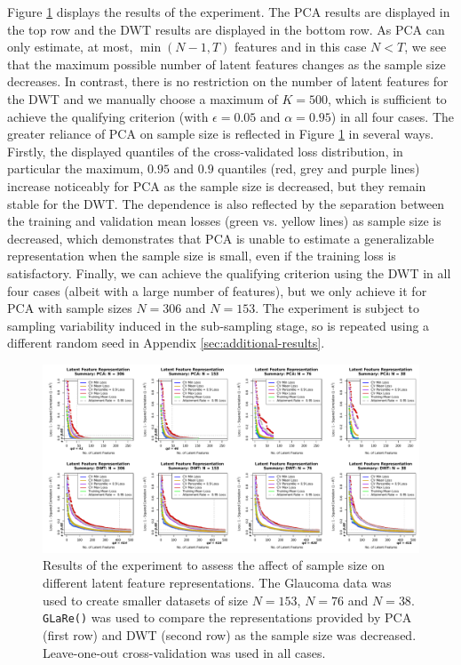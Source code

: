 Figure \ref{fig:eye-sample-size-results-results-01} displays the results of the experiment.
The PCA results are displayed in the top row and the DWT results are displayed in the bottom row.
As PCA can only estimate, at most, $\min(N-1, T)$ features and in this case $N<T$, we see that the maximum possible number of latent features changes as the sample size decreases.
In contrast, there is no restriction on the number of latent features for the DWT and we manually choose a maximum of $K=500$, which is sufficient to achieve the qualifying criterion (with $\epsilon=0.05$ and $\alpha=0.95$) in all four cases.
The greater reliance of PCA on sample size is reflected in Figure \ref{fig:eye-sample-size-results-results-01} in several ways.
Firstly, the displayed quantiles of the cross-validated loss distribution, in particular the maximum, $0.95$ and $0.9$ quantiles (red, grey and purple lines) increase noticeably for PCA as the sample size is decreased, but they remain stable for the DWT.
The dependence is also reflected by the separation between the training and validation mean losses (green vs. yellow lines) as sample size is decreased, which demonstrates that PCA is unable to estimate a generalizable representation when the sample size is small, even if the training loss is satisfactory.
Finally, we can achieve the qualifying criterion using the DWT in all four cases (albeit with a large number of features), but we only achieve it for PCA with sample sizes $N=306$ and $N=153$.
The experiment is subject to sampling variability induced in the sub-sampling stage, so is repeated using a different random seed in Appendix \ref{sec:additional-results}.

\begin{figure}
    \centering
    \includegraphics[width=1\linewidth]{figures/eye-sample-size-results-results.pdf}
    \caption{Results of the experiment to assess the affect of sample size on different latent feature representations. The Glaucoma data was used to create smaller datasets of size $N=153$, $N=76$ and $N=38$. \texttt{GLaRe()} was used to compare the representations provided by PCA (first row) and DWT (second row) as the sample size was decreased. Leave-one-out cross-validation was used in all cases.}
    \label{fig:eye-sample-size-results-results-01}
\end{figure}



